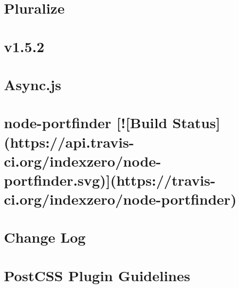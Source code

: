 \documentclass[twoside]{book}
\newcommand{\+}{\discretionary{\mbox{\scriptsize$\hookleftarrow$}}{}{}}
\begin{document}
\chapter{Pluralize}
\label{md__c_1_workspace_demo_src_main_script_node_modules_pluralize__readme}

\chapter{v1.5.2}
\label{md__c_1_workspace_demo_src_main_script_node_modules_portfinder_node_modules_async__c_h_a_n_g_e_l_o_g}

\chapter{Async.\+js}
\label{md__c_1_workspace_demo_src_main_script_node_modules_portfinder_node_modules_async__r_e_a_d_m_e}

\chapter{node-\/portfinder \mbox{[}!\mbox{[}Build Status\mbox{]}(https\+://api.travis-\/ci.org/indexzero/node-\/portfinder.svg)\mbox{]}(https\+://travis-\/ci.org/indexzero/node-\/portfinder)}
\label{md__c_1_workspace_demo_src_main_script_node_modules_portfinder__r_e_a_d_m_e}

\chapter{Change Log}
\label{md__c_1_workspace_demo_src_main_script_node_modules_postcss__c_h_a_n_g_e_l_o_g}

\chapter{Post\+C\+SS Plugin Guidelines}
\label{md__c_1_workspace_demo_src_main_script_node_modules_postcss_docs_guidelines_plugin}

\end{document}
